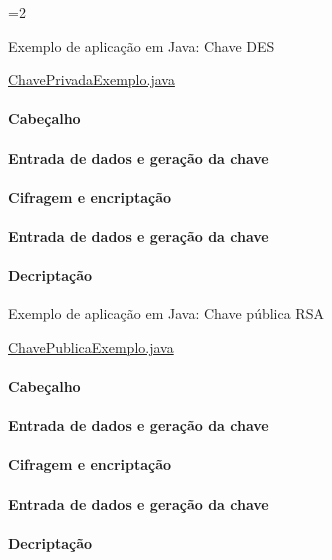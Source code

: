=2
\begin{frame}[fragile]{Exemplo de aplicação em Java: Chave DES}

\noindent \href{http://book.holanda.xyz/sec/src/crypto/ChavePrivadaExemplo.java}{ChavePrivadaExemplo.java}

 {
\framesubtitle{Cabeçalho}

}  


 {
\framesubtitle{Entrada de dados e geração da chave}

}  


 {
\framesubtitle{Cifragem e encriptação}

}  

 {
\framesubtitle{Entrada de dados e geração da chave}
  
}  

 {
  \framesubtitle{Decriptação}
   
}  



\end{frame}

\begin{frame}[fragile]{Exemplo de aplicação em Java: Chave pública RSA}

\noindent \href{http://book.holanda.xyz/sec/src/crypto/ChavePublicaExemplo.java}{ChavePublicaExemplo.java}

 {
\framesubtitle{Cabeçalho}

}  


 {
\framesubtitle{Entrada de dados e geração da chave}

}  


 {
\framesubtitle{Cifragem e encriptação}

}  

 {
\framesubtitle{Entrada de dados e geração da chave}
  
}  

 {
  \framesubtitle{Decriptação}
   
}  

\end{frame}


